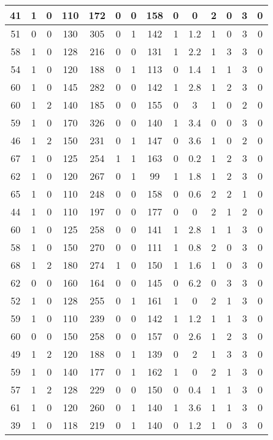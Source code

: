 \documentclass{article}
\begin{document}
\begin{longtable}{|c|c|c|c|c|c|c|c|c|c|c|c|c|c|}
\hline
41 & 1 & 0 & 110 & 172 & 0 & 0 & 158 & 0 & 0 & 2 & 0 & 3 & 0\\
\hline
51 & 0 & 0 & 130 & 305 & 0 & 1 & 142 & 1 & 1.2 & 1 & 0 & 3 & 0\\
\hline
58 & 1 & 0 & 128 & 216 & 0 & 0 & 131 & 1 & 2.2 & 1 & 3 & 3 & 0\\
\hline
54 & 1 & 0 & 120 & 188 & 0 & 1 & 113 & 0 & 1.4 & 1 & 1 & 3 & 0\\
\hline
60 & 1 & 0 & 145 & 282 & 0 & 0 & 142 & 1 & 2.8 & 1 & 2 & 3 & 0\\
\hline
60 & 1 & 2 & 140 & 185 & 0 & 0 & 155 & 0 & 3 & 1 & 0 & 2 & 0\\
\hline
59 & 1 & 0 & 170 & 326 & 0 & 0 & 140 & 1 & 3.4 & 0 & 0 & 3 & 0\\
\hline
46 & 1 & 2 & 150 & 231 & 0 & 1 & 147 & 0 & 3.6 & 1 & 0 & 2 & 0\\
\hline
67 & 1 & 0 & 125 & 254 & 1 & 1 & 163 & 0 & 0.2 & 1 & 2 & 3 & 0\\
\hline
62 & 1 & 0 & 120 & 267 & 0 & 1 & 99 & 1 & 1.8 & 1 & 2 & 3 & 0\\
\hline
65 & 1 & 0 & 110 & 248 & 0 & 0 & 158 & 0 & 0.6 & 2 & 2 & 1 & 0\\
\hline
44 & 1 & 0 & 110 & 197 & 0 & 0 & 177 & 0 & 0 & 2 & 1 & 2 & 0\\
\hline
60 & 1 & 0 & 125 & 258 & 0 & 0 & 141 & 1 & 2.8 & 1 & 1 & 3 & 0\\
\hline
58 & 1 & 0 & 150 & 270 & 0 & 0 & 111 & 1 & 0.8 & 2 & 0 & 3 & 0\\
\hline
68 & 1 & 2 & 180 & 274 & 1 & 0 & 150 & 1 & 1.6 & 1 & 0 & 3 & 0\\
\hline
62 & 0 & 0 & 160 & 164 & 0 & 0 & 145 & 0 & 6.2 & 0 & 3 & 3 & 0\\
\hline
52 & 1 & 0 & 128 & 255 & 0 & 1 & 161 & 1 & 0 & 2 & 1 & 3 & 0\\
\hline
59 & 1 & 0 & 110 & 239 & 0 & 0 & 142 & 1 & 1.2 & 1 & 1 & 3 & 0\\
\hline
60 & 0 & 0 & 150 & 258 & 0 & 0 & 157 & 0 & 2.6 & 1 & 2 & 3 & 0\\
\hline
49 & 1 & 2 & 120 & 188 & 0 & 1 & 139 & 0 & 2 & 1 & 3 & 3 & 0\\
\hline
59 & 1 & 0 & 140 & 177 & 0 & 1 & 162 & 1 & 0 & 2 & 1 & 3 & 0\\
\hline
57 & 1 & 2 & 128 & 229 & 0 & 0 & 150 & 0 & 0.4 & 1 & 1 & 3 & 0\\
\hline
61 & 1 & 0 & 120 & 260 & 0 & 1 & 140 & 1 & 3.6 & 1 & 1 & 3 & 0\\
\hline
39 & 1 & 0 & 118 & 219 & 0 & 1 & 140 & 0 & 1.2 & 1 & 0 & 3 & 0\\

\end{longtable}
\end{document}
